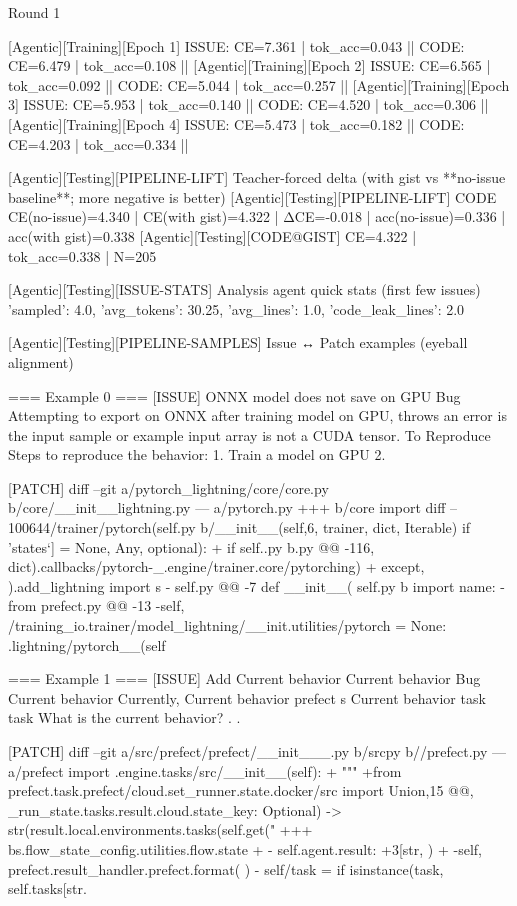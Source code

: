 Round 1 

[Agentic][Training][Epoch 1] ISSUE: CE=7.361 | tok_acc=0.043  ||  CODE: CE=6.479 | tok_acc=0.108  ||  
[Agentic][Training][Epoch 2] ISSUE: CE=6.565 | tok_acc=0.092  ||  CODE: CE=5.044 | tok_acc=0.257  ||  
[Agentic][Training][Epoch 3] ISSUE: CE=5.953 | tok_acc=0.140  ||  CODE: CE=4.520 | tok_acc=0.306  ||  
[Agentic][Training][Epoch 4] ISSUE: CE=5.473 | tok_acc=0.182  ||  CODE: CE=4.203 | tok_acc=0.334  ||  

[Agentic][Testing][PIPELINE-LIFT] Teacher-forced delta (with gist vs **no-issue baseline**; more negative is better)
[Agentic][Testing][PIPELINE-LIFT] CODE CE(no-issue)=4.340 | CE(with gist)=4.322 | ΔCE=-0.018 | acc(no-issue)=0.336 | acc(with gist)=0.338
[Agentic][Testing][CODE@GIST] CE=4.322 | tok_acc=0.338 | N=205

[Agentic][Testing][ISSUE-STATS] Analysis agent quick stats (first few issues)
{'sampled': 4.0, 'avg_tokens': 30.25, 'avg_lines': 1.0, 'code_leak_lines': 2.0}

[Agentic][Testing][PIPELINE-SAMPLES] Issue ↔ Patch examples (eyeball alignment)

=== Example 0 ===
[ISSUE]
ONNX model does not save on GPU Bug Attempting to export on ONNX after training model on GPU, throws an error is the input sample or example input array is not a CUDA tensor. To Reproduce Steps to reproduce the behavior: 1. Train a model on GPU 2.

[PATCH]
diff --git a/pytorch_lightning/core/core.py b/core/__init__lightning.py --- a/pytorch.py +++ b/core import diff -- 100644/trainer/pytorch(self.py b/__init__(self,6, trainer, dict, Iterable) if 'states`] = None, Any, optional): + if self..py b.py @@ -116, dict).callbacks/pytorch-_.engine/trainer.core/pytorching) + except, ).add_lightning import s - self.py @@ -7 def __init__( self.py b import name: -from prefect.py @@ -13 -self, /training_io.trainer/model_lightning/__init.utilities/pytorch = None: .lightning/pytorch__(self

=== Example 1 ===
[ISSUE]
Add Current behavior Current behavior Bug Current behavior Currently, Current behavior prefect s Current behavior task task What is the current behavior? . .

[PATCH]
diff --git a/src/prefect/prefect/__init___.py b/srcpy b//prefect.py --- a/prefect import .engine.tasks/src/__init__(self): + """ +from prefect.task.prefect/cloud.set_runner.state.docker/src import Union,15 @@, _run_state.tasks.result.cloud.state_key: Optional) -> str(result.local.environments.tasks(self.get(" +++ bs.flow_state_config.utilities.flow.state + - self.agent.result: +3[str, ) + -self, prefect.result_handler.prefect.format( ) - self/task = if isinstance(task, self.tasks[str.

